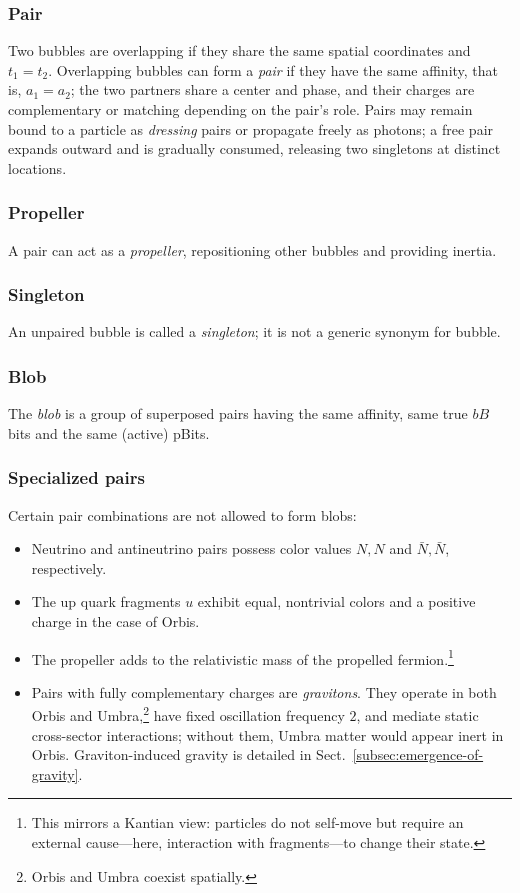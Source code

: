 \documentclass{ijuc}
\begin{document}
\subsubsection{Pair}
Two bubbles are overlapping if they share the same spatial coordinates and $t_1=t_2$. Overlapping bubbles can form a \emph{pair} if they have the same affinity, that is, $a_1=a_2$; the two partners share a center and phase, and their charges are complementary or matching depending on the pair's role. Pairs may remain bound to a particle as \emph{dressing} pairs or propagate freely as photons; a free pair expands outward and is gradually consumed, releasing two singletons at distinct locations.

\subsubsection{Propeller} \label{subsubsec:propeller}
A pair can act as a \textit{propeller}, repositioning other bubbles and providing inertia.

\subsubsection{Singleton}
An unpaired bubble is called a \textit{singleton}; it is not a generic synonym for bubble.

\subsubsection{Blob}
The \textit{blob} is a group of superposed pairs having the same affinity, same true $bB$ bits and the same (active) pBits.

\subsubsection{Specialized pairs} \label{subsec:specialized-pairs}
Certain pair combinations are not allowed to form blobs: 

\begin{itemize}
    \item Neutrino and antineutrino pairs possess color values $N, N$ and $\bar{N}, \bar{N}$, respectively.

    \item The up quark fragments $u$ exhibit equal, nontrivial colors and a positive charge in the case of Orbis. 

    \item The propeller adds to the relativistic mass of the propelled fermion.\footnote{This mirrors a Kantian view: particles do not self-move but require an external cause—here, interaction with fragments—to change their state.}

    \item Pairs with fully complementary charges are \emph{gravitons}. They operate in both Orbis and Umbra,\footnote{Orbis and Umbra coexist spatially.} have fixed oscillation frequency $2$, and mediate static cross-sector interactions; without them, Umbra matter would appear inert in Orbis. Graviton-induced gravity is detailed in Sect.~\ref{subsec:emergence-of-gravity}.
\end{itemize}
\end{document}
